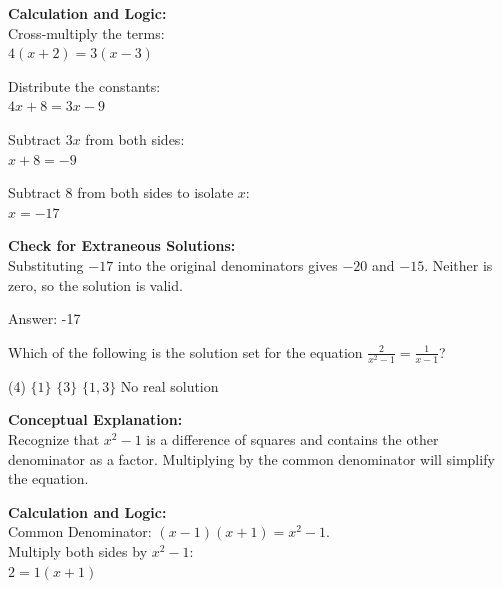 \documentclass[11pt,paper=a4,answers]{exam}
\begin{document}
\begin{questions}
\begin{solution}
\textbf{Calculation and Logic:} \\
Cross-multiply the terms: \\
$4(x + 2) = 3(x - 3)$

\vspace{15pt}

Distribute the constants: \\
$4x + 8 = 3x - 9$

\vspace{15pt}

Subtract $3x$ from both sides: \\
$x + 8 = -9$

\vspace{15pt}

Subtract 8 from both sides to isolate $x$: \\
$x = -17$

\vspace{15pt}

\textbf{Check for Extraneous Solutions:} \\
Substituting $-17$ into the original denominators gives $-20$ and $-15$. Neither is zero, so the solution is valid.

\vspace{30pt}

Answer: \colorbox{yellow!100}{-17}
\end{solution}

\vspace{40pt}

\question
Which of the following is the solution set for the equation $\frac{2}{x^2 - 1} = \frac{1}{x-1}$?
\begin{tasks}(4)
    \task $\{1\}$
    \task $\{3\}$
    \task $\{1, 3\}$
    \task No real solution
\end{tasks}

\begin{solution}
\textbf{Conceptual Explanation:} \\
Recognize that $x^2 - 1$ is a difference of squares and contains the other denominator as a factor. Multiplying by the common denominator will simplify the equation.

\vspace{30pt}

\textbf{Calculation and Logic:} \\
Common Denominator: $(x-1)(x+1) = x^2 - 1$. \\
Multiply both sides by $x^2 - 1$: \\
$2 = 1(x + 1)$


\end{solution}
\end{questions}
\end{document}
